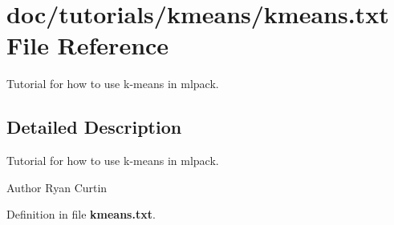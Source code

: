 \section{doc/tutorials/kmeans/kmeans.txt File Reference}
\label{kmeans_8txt}


Tutorial for how to use k-\/means in mlpack.  




\subsection{Detailed Description}
Tutorial for how to use k-\/means in mlpack. \begin{DoxyAuthor}{Author}
Ryan Curtin 
\end{DoxyAuthor}


Definition in file {\bf kmeans.\-txt}.

